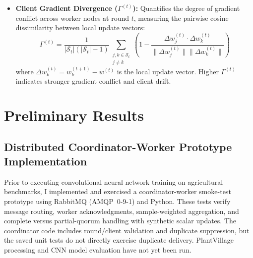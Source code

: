 \documentclass[applsci,article,submit,oneauthor,pdftex]{Definitions/mdpi}
\begin{document}
\begin{itemize}[leftmargin=*]
    \begin{equation}
    R_{\tau} = \min\{r \in \{1, \dots, T\} : \mathrm{Acc}_r \geq \tau\}
    \end{equation}
    \item \textbf{Client Gradient Divergence ($\Gamma^{(t)}$):} Quantifies the degree of gradient conflict across worker nodes at round $t$, measuring the pairwise cosine dissimilarity between local update vectors:
    \begin{equation}
    \Gamma^{(t)} = \frac{1}{|\mathcal{S}_t|(|\mathcal{S}_t|-1)} \sum_{\substack{j,k \in \mathcal{S}_t \\ j \neq k}} \left(1 - \frac{\Delta w_j^{(t)} \cdot \Delta w_k^{(t)}}{\|\Delta w_j^{(t)}\| \|\Delta w_k^{(t)}\|}\right)
    \end{equation}
    where $\Delta w_k^{(t)} = w_k^{(t+1)} - w^{(t)}$ is the local update vector. Higher $\Gamma^{(t)}$ indicates stronger gradient conflict and client drift.
\end{itemize}

\section{Preliminary Results}
\label{sec:preliminary_results}

\subsection{Distributed Coordinator-Worker Prototype Implementation}
Prior to executing convolutional neural network training on agricultural benchmarks, I implemented and exercised a coordinator-worker smoke-test prototype using RabbitMQ (AMQP~0-9-1) and Python. These tests verify message routing, worker acknowledgments, sample-weighted aggregation, and complete versus partial-quorum handling with synthetic scalar updates. The coordinator code includes round/client validation and duplicate suppression, but the saved unit tests do not directly exercise duplicate delivery. PlantVillage processing and CNN model evaluation have not yet been run.
\end{document}
